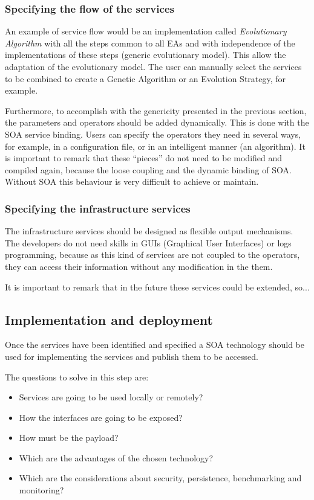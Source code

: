 \subsubsection{Specifying the flow of the services}
An example of service flow would be an implementation called {\em Evolutionary Algorithm} with all the steps common to all EAs and with independence of the implementations of these steps (generic evolutionary model). This allow the adaptation of the evolutionary model. The user can manually
  select the services to be combined to create a Genetic Algorithm or
  an Evolution Strategy, for example.  

  Furthermore, to accomplish with the genericity presented in the previous section, the parameters and operators should be added dynamically. This is done with the SOA service binding. Users can specify the operators they need in several ways, for example, in a configuration file, or in an intelligent manner (an algorithm). It is important to remark that these ``pieces'' do not need to be modified and compiled again, because the loose coupling and the dynamic binding of SOA. Without SOA this behaviour is very difficult to achieve or maintain.

\subsubsection{Specifying the infrastructure services}
The infrastructure services should be designed as flexible output mechanisms. The developers do not need skills in
  GUIs (Graphical User Interfaces) or logs programming, because as
  this kind of services are not coupled to the operators, they can
  access their information without any modification in the
  them. %



It is important to remark that in the future these services could be extended, so...

\subsection{Implementation and deployment}

Once the services have been identified and specified a SOA technology should be used for implementing the services and publish them to be accessed.

The questions to solve in this step are:
\begin{itemize}
\item Services are going to be used locally or remotely?
\item How the interfaces are going to be exposed?
\item How must be the payload? %
\item Which are the advantages of the chosen technology?
\item Which are the considerations about security, persistence, benchmarking and monitoring?
\end{itemize} 

